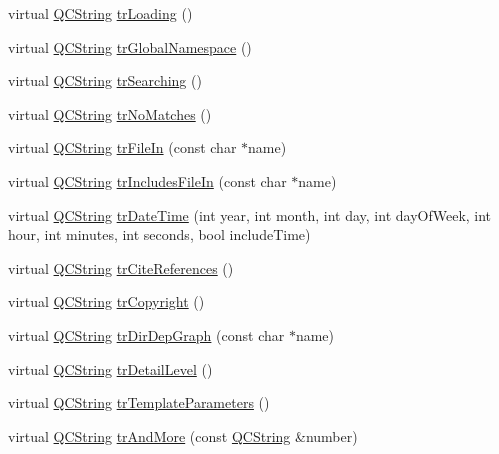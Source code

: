 \begin{DoxyCompactItemize}
virtual \hyperlink{class_q_c_string}{Q\-C\-String} \hyperlink{class_translator_greek_aca8cf7409bceb9f8e6af47f637da5457}{tr\-Loading} ()
\item 
virtual \hyperlink{class_q_c_string}{Q\-C\-String} \hyperlink{class_translator_greek_aa9fd39641e570165be20c71c67481fee}{tr\-Global\-Namespace} ()
\item 
virtual \hyperlink{class_q_c_string}{Q\-C\-String} \hyperlink{class_translator_greek_aea79f5912e787bbb2c441223ccd382c6}{tr\-Searching} ()
\item 
virtual \hyperlink{class_q_c_string}{Q\-C\-String} \hyperlink{class_translator_greek_a240e49b617153456e0f29bef561cc10f}{tr\-No\-Matches} ()
\item 
virtual \hyperlink{class_q_c_string}{Q\-C\-String} \hyperlink{class_translator_greek_acf964d17bad4c55c393193fe9708575f}{tr\-File\-In} (const char $\ast$name)
\item 
virtual \hyperlink{class_q_c_string}{Q\-C\-String} \hyperlink{class_translator_greek_a53f57c6e2aa0b9dc09bc47b3746d3481}{tr\-Includes\-File\-In} (const char $\ast$name)
\item 
virtual \hyperlink{class_q_c_string}{Q\-C\-String} \hyperlink{class_translator_greek_a19c43671f677ae0445fca1fe7a5f62cc}{tr\-Date\-Time} (int year, int month, int day, int day\-Of\-Week, int hour, int minutes, int seconds, bool include\-Time)
\item 
virtual \hyperlink{class_q_c_string}{Q\-C\-String} \hyperlink{class_translator_greek_ae43b2c6dbb1637144e32cd13a0d4704c}{tr\-Cite\-References} ()
\item 
virtual \hyperlink{class_q_c_string}{Q\-C\-String} \hyperlink{class_translator_greek_a840474c30dfc2d4e92d1a29c5d1bf343}{tr\-Copyright} ()
\item 
virtual \hyperlink{class_q_c_string}{Q\-C\-String} \hyperlink{class_translator_greek_abbe522be6eed72f54409458a1896323c}{tr\-Dir\-Dep\-Graph} (const char $\ast$name)
\item 
virtual \hyperlink{class_q_c_string}{Q\-C\-String} \hyperlink{class_translator_greek_a138b581235bf64a0338ed25ee0d1ad61}{tr\-Detail\-Level} ()
\item 
virtual \hyperlink{class_q_c_string}{Q\-C\-String} \hyperlink{class_translator_greek_ad9599164391093757c91bbe746f694a5}{tr\-Template\-Parameters} ()
\item 
virtual \hyperlink{class_q_c_string}{Q\-C\-String} \hyperlink{class_translator_greek_a391327398836ee03f1d00415b80cb997}{tr\-And\-More} (const \hyperlink{class_q_c_string}{Q\-C\-String} \&number)

\end{DoxyCompactItemize}
